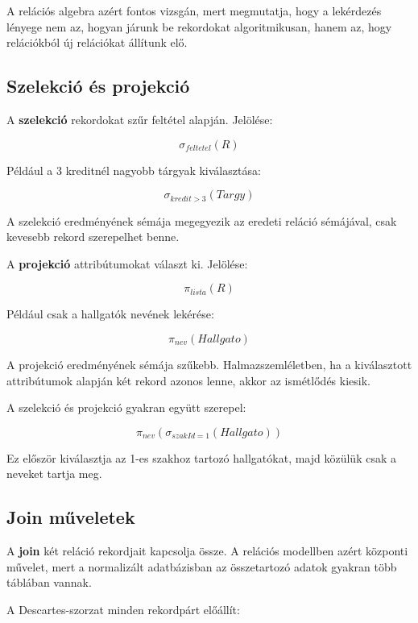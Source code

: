 

A relációs algebra azért fontos vizsgán, mert megmutatja, hogy a lekérdezés lényege nem az, hogyan járunk be rekordokat algoritmikusan, hanem az, hogy relációkból új relációkat állítunk elő.

\begin{center}

\end{center}

\subsection{Szelekció és projekció}

A \textbf{szelekció} rekordokat szűr feltétel alapján. Jelölése:

\[
  \sigma_{feltetel}(R)
\]

Például a 3 kreditnél nagyobb tárgyak kiválasztása:

\[
  \sigma_{kredit > 3}(Targy)
\]

A szelekció eredményének sémája megegyezik az eredeti reláció sémájával, csak kevesebb rekord szerepelhet benne.

A \textbf{projekció} attribútumokat választ ki. Jelölése:

\[
  \pi_{lista}(R)
\]

Például csak a hallgatók nevének lekérése:

\[
  \pi_{nev}(Hallgato)
\]

A projekció eredményének sémája szűkebb. Halmazszemléletben, ha a kiválasztott attribútumok alapján két rekord azonos lenne, akkor az ismétlődés kiesik.

A szelekció és projekció gyakran együtt szerepel:

\[
  \pi_{nev}(\sigma_{szakId = 1}(Hallgato))
\]

Ez először kiválasztja az 1-es szakhoz tartozó hallgatókat, majd közülük csak a neveket tartja meg.

\subsection{Join műveletek}

A \textbf{join} két reláció rekordjait kapcsolja össze. A relációs modellben azért központi művelet, mert a normalizált adatbázisban az összetartozó adatok gyakran több táblában vannak.

A Descartes-szorzat minden rekordpárt előállít:

